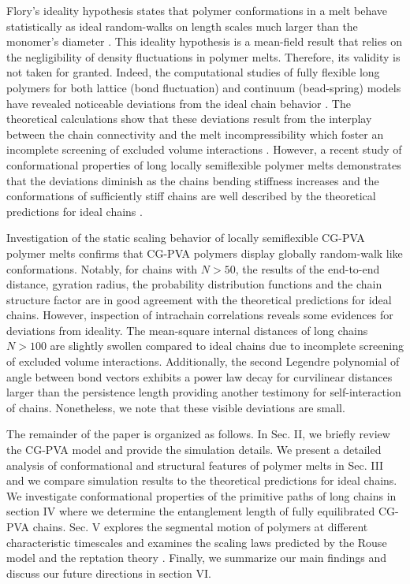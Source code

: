\documentclass[pre,showpacs,notitlepage,twocolumn]{revtex4-1}
\begin{document}
 
 Flory's ideality  hypothesis  states that polymer conformations in a melt behave statistically as ideal random-walks on length scales much larger than the monomer's diameter \cite{Flory,polymerDoi}.
 This ideality hypothesis is a mean-field result that relies on the negligibility of density fluctuations in polymer melts.
Therefore, its validity  is  not taken for granted. Indeed, the computational studies of fully flexible long polymers for both lattice (bond fluctuation) and continuum  (bead-spring)  models  have revealed  noticeable deviations from the ideal chain behavior   \cite{Wittmer2004,Wittmer2007a,Wittmer2007b,formfactor2007,Hsu2014}. 
The theoretical calculations show that these  deviations result from the interplay between the chain connectivity and the melt incompressibility  which foster an incomplete screening of excluded volume 
 interactions  \cite{Wittmer2007a,formfactor2007,Semenov}.  However, a recent study of conformational properties of long locally semiflexible polymer melts demonstrates that the deviations
 diminish  as the chains bending stiffness  increases and the conformations of sufficiently stiff  chains  are well described by  the theoretical predictions for
 ideal chains \cite{Kremer2016}.
 
 
 Investigation of the static scaling behavior  of locally semiflexible CG-PVA  polymer melts confirms that  CG-PVA polymers display globally random-walk like conformations.
 Notably, for chains with $N>50$, the results of the end-to-end distance, gyration radius, the probability distribution functions  and the chain structure factor are in good agreement with 
the theoretical predictions for ideal chains. However, inspection of intrachain correlations reveals some evidences for deviations from ideality. The mean-square internal distances of long chains $N>100$  are slightly swollen compared to ideal chains due to incomplete
screening of excluded volume interactions. Additionally, the second Legendre polynomial of angle between bond vectors exhibits a power law decay for   curvilinear distances  larger than the persistence length providing another
testimony for self-interaction of chains. Nonetheless, we note that these visible deviations are small.

 The remainder of the paper is organized as follows. In Sec. II, we briefly review  the CG-PVA model and 
provide the simulation details. We present  a detailed analysis of  conformational and structural features of polymer melts  in Sec. III and we compare simulation results to the theoretical predictions for ideal chains.
We investigate  conformational properties of the primitive paths of
long chains  in section IV where we  determine the  entanglement length of fully equilibrated CG-PVA chains.
Sec. V explores the segmental motion of polymers  at different characteristic timescales and examines the scaling
laws predicted by the Rouse model and the reptation theory \cite{Rubinstein,polymerDeGennes,polymerDoi}.
Finally,  we summarize our main findings and discuss our future directions  in section VI. 
\end{document}
